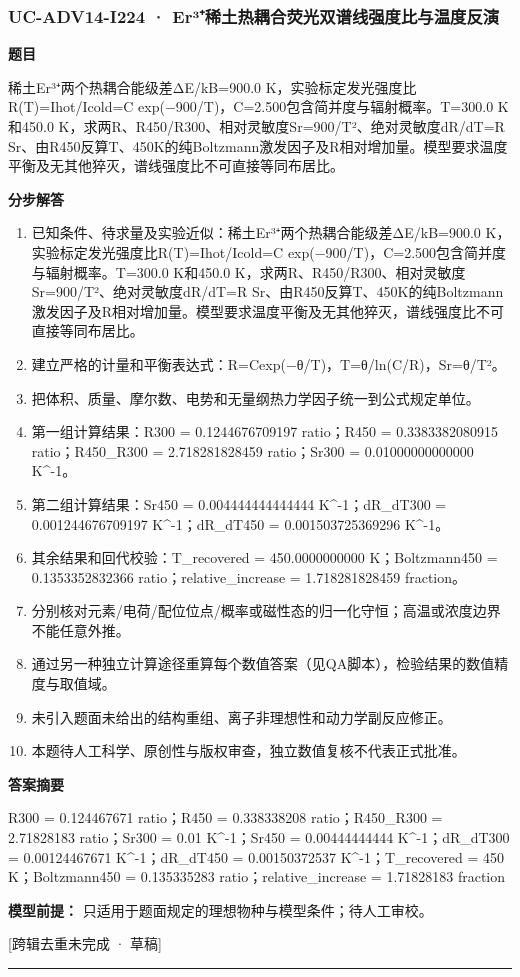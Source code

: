 \documentclass[UTF8,11pt,a4paper]{ctexart}
\begin{document}
\subsubsection*{UC-ADV14-I224 · Er³⁺稀土热耦合荧光双谱线强度比与温度反演}
\noindent\textbf{题目}\par
稀土Er³⁺两个热耦合能级差ΔE/kB=900.0 K，实验标定发光强度比R(T)=Ihot/Icold=C exp(−900/T)，C=2.500包含简并度与辐射概率。T=300.0 K和450.0 K，求两R、R450/R300、相对灵敏度Sr=900/T²、绝对灵敏度dR/dT=R Sr、由R450反算T、450K的纯Boltzmann激发因子及R相对增加量。模型要求温度平衡及无其他猝灭，谱线强度比不可直接等同布居比。\par
\medskip\noindent\textbf{分步解答}
\begin{enumerate}
\item 已知条件、待求量及实验近似：稀土Er³⁺两个热耦合能级差ΔE/kB=900.0 K，实验标定发光强度比R(T)=Ihot/Icold=C exp(−900/T)，C=2.500包含简并度与辐射概率。T=300.0 K和450.0 K，求两R、R450/R300、相对灵敏度Sr=900/T²、绝对灵敏度dR/dT=R Sr、由R450反算T、450K的纯Boltzmann激发因子及R相对增加量。模型要求温度平衡及无其他猝灭，谱线强度比不可直接等同布居比。
\item 建立严格的计量和平衡表达式：R=Cexp(−θ/T)，T=θ/ln(C/R)，Sr=θ/T²。
\item 把体积、质量、摩尔数、电势和无量纲热力学因子统一到公式规定单位。
\item 第一组计算结果：R300 = 0.1244676709197 ratio；R450 = 0.3383382080915 ratio；R450\_R300 = 2.718281828459 ratio；Sr300 = 0.01000000000000 K\textasciicircum{}-1。
\item 第二组计算结果：Sr450 = 0.004444444444444 K\textasciicircum{}-1；dR\_dT300 = 0.001244676709197 K\textasciicircum{}-1；dR\_dT450 = 0.001503725369296 K\textasciicircum{}-1。
\item 其余结果和回代校验：T\_recovered = 450.0000000000 K；Boltzmann450 = 0.1353352832366 ratio；relative\_increase = 1.718281828459 fraction。
\item 分别核对元素/电荷/配位位点/概率或磁性态的归一化守恒；高温或浓度边界不能任意外推。
\item 通过另一种独立计算途径重算每个数值答案（见QA脚本），检验结果的数值精度与取值域。
\item 未引入题面未给出的结构重组、离子非理想性和动力学副反应修正。
\item 本题待人工科学、原创性与版权审查，独立数值复核不代表正式批准。
\end{enumerate}
\noindent\textbf{答案摘要}\par
R300 = 0.124467671 ratio；R450 = 0.338338208 ratio；R450\_R300 = 2.71828183 ratio；Sr300 = 0.01 K\textasciicircum{}-1；Sr450 = 0.00444444444 K\textasciicircum{}-1；dR\_dT300 = 0.00124467671 K\textasciicircum{}-1；dR\_dT450 = 0.00150372537 K\textasciicircum{}-1；T\_recovered = 450 K；Boltzmann450 = 0.135335283 ratio；relative\_increase = 1.71828183 fraction\par
\noindent\textbf{模型前提：}
只适用于题面规定的理想物种与模型条件；待人工审校。\par
\noindent\textcolor{red!65!black}{[跨辑去重未完成 · 草稿]} \par
\medskip\hrule\medskip
{}
\end{document}
